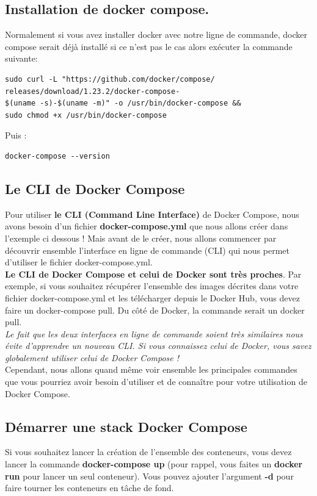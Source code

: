 \documentclass[12pt,a4paper]{article}
\begin{document}
\subsection{Installation de docker compose.}
Normalement si vous avez installer docker avec notre ligne de commande, docker compose
serait déjà installé si ce n'est pas le cas alors exécuter la commande suivante:
\begin{verbatim}
sudo curl -L "https://github.com/docker/compose/
releases/download/1.23.2/docker-compose-
$(uname -s)-$(uname -m)" -o /usr/bin/docker-compose && 
sudo chmod +x /usr/bin/docker-compose
\end{verbatim}
Puis :\\
\begin{verbatim}
docker-compose --version
\end{verbatim}

\subsection{Le CLI de Docker Compose}
Pour utiliser \textbf{le CLI (Command Line Interface)} de Docker Compose, nous avons besoin d'un fichier \textbf{docker-compose.yml} 
que nous allons créer dans l'exemple ci dessous ! Mais avant de le créer, nous allons commencer par découvrir ensemble l'interface 
en ligne de commande (CLI) qui nous permet d'utiliser le fichier docker-compose.yml.\\
\textbf{Le CLI de Docker Compose et celui de Docker sont très proches}. Par exemple, si vous souhaitez récupérer l'ensemble des images décrites 
dans votre fichier docker-compose.yml et les télécharger depuis le Docker Hub, vous devez faire un docker-compose pull. 
Du côté de Docker, la commande serait un docker pull.\\

\textit{Le fait que les deux interfaces en ligne de commande soient très similaires nous évite d'apprendre un nouveau CLI. Si vous connaissez celui de Docker, vous savez globalement utiliser celui de Docker Compose !}\\

Cependant, nous allons quand même voir ensemble les principales commandes que vous pourriez avoir besoin d'utiliser et de connaître pour votre utilisation de Docker Compose.

\subsection{Démarrer une stack Docker Compose}
Si vous souhaitez lancer la création de l'ensemble des conteneurs, vous devez lancer la commande \textbf{docker-compose up} (pour rappel, vous faites un \textbf{docker run} pour lancer un seul conteneur). Vous pouvez ajouter l’argument \textbf{-d} pour faire tourner les conteneurs en tâche de fond.\\
\end{document}
